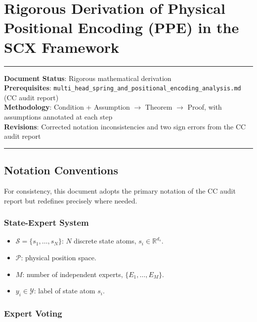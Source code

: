 \documentclass[
  12pt,
]{article}
\author{SCX}
\date{2026}
\providecommand{\tightlist}{%
  \setlength{\itemsep}{0pt}\setlength{\parskip}{0pt}}
\begin{document}
\section{Rigorous Derivation of Physical Positional Encoding (PPE) in the SCX Framework}\label{ppe-rigorous-derivation}

\begin{center}\rule{0.5\linewidth}{0.5pt}\end{center}

\textbf{Document Status}: Rigorous mathematical derivation\\
\textbf{Prerequisites}: \texttt{multi\_head\_spring\_and\_positional\_encoding\_analysis.md} (CC audit report)\\
\textbf{Methodology}: Condition + Assumption $\to$ Theorem $\to$ Proof, with assumptions annotated at each step\\
\textbf{Revisions}: Corrected notation inconsistencies and two sign errors from the CC audit report

\begin{center}\rule{0.5\linewidth}{0.5pt}\end{center}

\subsection{Notation Conventions}\label{notation-conventions}

For consistency, this document adopts the primary notation of the CC audit report but redefines precisely where needed.

\subsubsection{State-Expert System}\label{state-expert-system}

\begin{itemize}
\tightlist
\item
  $\mathcal{S} = \{s_1, \ldots, s_N\}$: $N$ discrete state atoms, $s_i \in \mathbb{R}^{d_s}$.
\item
  $\mathcal{P}$: physical position space.
\item
  $M$: number of independent experts, $\{E_1, \ldots, E_M\}$.
\item
  $y_i \in \mathcal{Y}$: label of state atom $s_i$.
\end{itemize}

\subsubsection{Expert Voting}\label{expert-voting}
\end{document}
